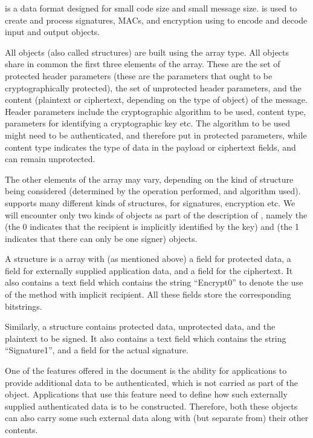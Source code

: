 {\mCbor{} is a data format designed for small code size and small message size. \mCose{} is used to create and process signatures, MACs, and encryption using \mCbor{} to encode and decode input and output objects.

All \mCose{} objects (also called structures) are built using the \mCbor{} array type. All objects share in common the first three elements of the array. These are the set of protected header parameters (these are the parameters that ought to be cryptographically protected), the set of unprotected header parameters, and the content (plaintext or ciphertext, depending on the type of \mCose{} object) of the message. Header parameters include the cryptographic algorithm to be used, content type, parameters for identifying a cryptographic key etc. The algorithm to be used might need to be authenticated, and therefore put in protected parameters, while content type indicates the type of data in the payload or ciphertext fields, and can remain unprotected.

The other elements of the \mCbor{} array may vary, depending on the kind of \mCose{} structure being considered (determined by the operation performed, and algorithm used). \mCose{} supports many different kinds of structures, for signatures, encryption etc. We will encounter only two kinds of \mCose{} objects as part of the description of \mEdhoc, namely the \mCoseEncrypt{} (the 0 indicates that the recipient is implicitly identified by the key) and \mCoseSign{} (the 1 indicates that there can only be one signer) objects.

A \mCoseEncrypt{} structure is a \mCbor{} array with (as mentioned above) a field for protected data, a field for externally supplied application data, and a field for the ciphertext. It also contains a text field which contains the string ``Encrypt0'' to denote the use of the method with implicit recipient. All these fields store the corresponding bitstrings.

Similarly, a \mCoseSign{} structure contains protected data, unprotected data, and the plaintext to be signed. It also contains a text field which contains the string ``Signature1'', and a field for the actual signature.

One of the features offered in the \mCose{} document is the ability for applications to provide additional data to be authenticated, which is not carried as part of the \mCose{} object. Applications that use this feature need to define how such externally supplied authenticated data is to be constructed. Therefore, both these objects can also carry some such external data along with (but separate from) their other contents.

}
